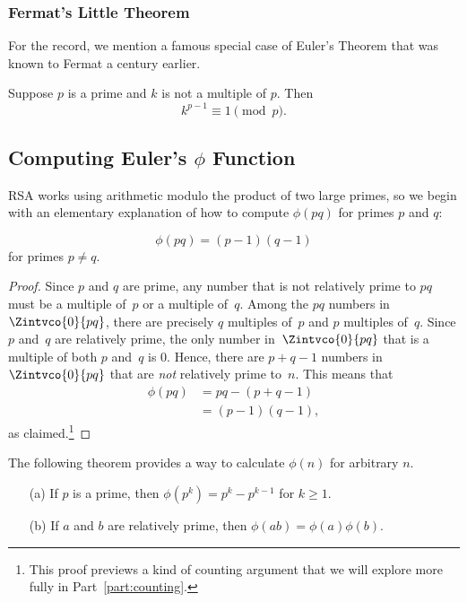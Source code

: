 \subsubsection{Fermat's Little Theorem}

For the record, we mention a famous special case of Euler's Theorem
that was known to Fermat a century
earlier.

\begin{corollary}\label{fermat_little}
Suppose $p$ is a prime and $k$ is not a multiple of $p$.  Then
\[
k^{p-1} \equiv 1 \pmod{p}.
\]
\end{corollary}

\subsection{Computing Euler's $\phi$ Function}

RSA works using arithmetic modulo the product of two large primes, so we begin with an
elementary explanation of how to compute $\phi(pq)$ for primes $p$ and $q$:

\begin{lemma}\label{phi_pq}    %
\[
\phi(pq) = (p-1) (q-1)
\]
for primes $p\neq q$.
\end{lemma}

\begin{proof}
Since $p$ and $q$ are prime, any number that is not relatively prime
to $pq$ must be a multiple of~$p$ or a multiple of~$q$.  Among the
$pq$ numbers in $\Zintvco{0}{pq}$, there are precisely $q$ multiples
of~$p$ and $p$ multiples of~$q$.  Since $p$ and~$q$ are relatively
prime, the only number in~$\Zintvco{0}{pq}$ that is a multiple of both
$p$ and~$q$ is 0.  Hence, there are $p + q - 1$ numbers
in~$\Zintvco{0}{pq}$ that are \emph{not} relatively prime to~$n$.  This
means that
\begin{align*}
    \phi(pq) & = pq - (p + q - 1) \\
& = (p - 1) (q - 1),
\end{align*}
as claimed.\footnote{This proof previews a kind of counting argument that we will explore
  more fully in Part~\ref{part:counting}.}
\end{proof}

The following theorem provides a way to calculate $\phi(n)$ for arbitrary $n$.
\begin{theorem}\label{th:phi}\mbox{}
\begin{enumerate}
\item[(a)] If $p$ is a prime, then $\phi(p^k) = p^k - p^{k-1}$ for $k \geq 1$.
\item[(b)] If $a$ and $b$ are relatively prime, then $\phi(ab) = \phi(a)\phi(b)$.
\end{enumerate}
\end{theorem}

